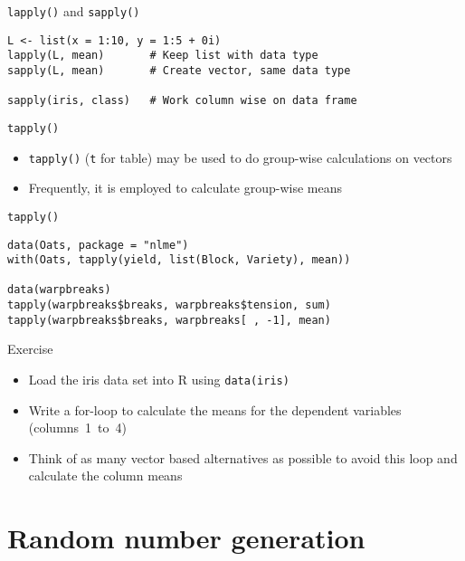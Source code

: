 \documentclass[aspectratio=169]{beamer}
\begin{document}
\begin{frame}[fragile]{\texttt{lapply()} and \texttt{sapply()}}
\begin{lstlisting}
L <- list(x = 1:10, y = 1:5 + 0i)
lapply(L, mean)       # Keep list with data type
sapply(L, mean)       # Create vector, same data type

sapply(iris, class)   # Work column wise on data frame
\end{lstlisting}
\end{frame}

\begin{frame}{\texttt{tapply()}}
  \begin{itemize}
    \item \texttt{tapply()} (\texttt{t} for table) may be used to do
      group-wise calculations on vectors
    \item Frequently, it is employed to calculate group-wise means
  \end{itemize}
\end{frame}

\begin{frame}[fragile]{\texttt{tapply()}}
\begin{lstlisting}
data(Oats, package = "nlme")
with(Oats, tapply(yield, list(Block, Variety), mean))

data(warpbreaks)
tapply(warpbreaks$breaks, warpbreaks$tension, sum)
tapply(warpbreaks$breaks, warpbreaks[ , -1], mean)
\end{lstlisting}
\end{frame}

\begin{frame}{}
  \begin{block}{Exercise}
  \begin{itemize}
    \item Load the iris data set into R using \texttt{data(iris)}
    \item Write a for-loop to calculate the means for the dependent
      variables (columns~1~to~4)
    \item Think of as many vector based alternatives as possible to avoid
      this loop and calculate the column means
  \end{itemize}
  \end{block}
\end{frame}

\section[Random numbers]{Random number generation}
\end{document}

